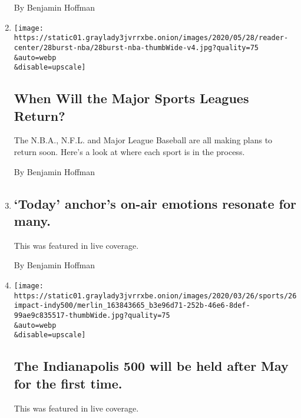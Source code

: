 \begin{enumerate}
  By Benjamin Hoffman
\item
  \href{/interactive/2020/05/28/burst/sports-return-nba-nfl-mlb-coronavirus.html}{}

  \texttt{[image: https://static01.graylady3jvrrxbe.onion/images/2020/05/28/reader-center/28burst-nba/28burst-nba-thumbWide-v4.jpg?quality=75\\\&auto=webp\\\&disable=upscale]}

  \hypertarget{when-will-the-major-sports-leagues-return}{%
  \subsection{When Will the Major Sports Leagues
  Return?}\label{when-will-the-major-sports-leagues-return}}

  The N.B.A., N.F.L. and Major League Baseball are all making plans to
  return soon. Here's a look at where each sport is in the process.

  By Benjamin Hoffman
\item
  \href{/live/2020/coronavirus-usa-03-27/today-anchors-on-air-emotions-resonate-for-many}{}

  \hypertarget{today-anchors-on-air-emotions-resonate-for-many}{%
  \subsection{`Today' anchor's on-air emotions resonate for
  many.}\label{today-anchors-on-air-emotions-resonate-for-many}}

  This was featured in live coverage.

  By Benjamin Hoffman
\item
  \href{/live/2020/coronavirus-usa-03-26/the-indianapolis-500-will-be-held-after-may-for-the-first-time}{}

  \texttt{[image: https://static01.graylady3jvrrxbe.onion/images/2020/03/26/sports/26impact-indy500/merlin\_163843665\_b3e96d71-252b-46e6-8def-99ae9c835517-thumbWide.jpg?quality=75\\\&auto=webp\\\&disable=upscale]}

  \hypertarget{the-indianapolis-500-will-be-held-after-may-for-the-first-time}{%
  \subsection{The Indianapolis 500 will be held after May for the first
  time.}\label{the-indianapolis-500-will-be-held-after-may-for-the-first-time}}

  This was featured in live coverage.


\end{enumerate}
